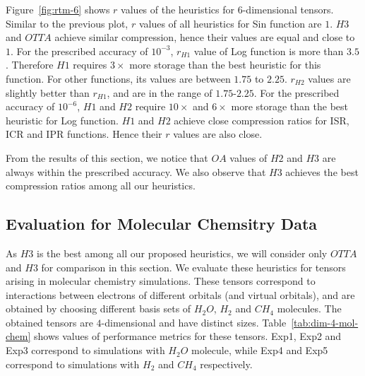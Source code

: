 \documentclass[runningheads]{llncs}
\begin{document}
\noindent Figure~\ref{fig:rtm-6} shows $r$ values of the heuristics for $6$-dimensional tensors. Similar to the previous plot, $r$ values of all heuristics for Sin function are $1$. ${H3}$ and ${OTTA}$ achieve similar compression, hence their values are equal and close to $1$. For the prescribed accuracy of $10^{-3}$, $r_{H1}$ value of Log function is more than $3.5$. Therefore $H1$ requires $3\times$ more storage than the best heuristic for this function. For other functions, its values are between $1.75$ to $2.25$. $r_{H2}$ values are slightly better than $r_{H1}$, and are in the range of $1.75$-$2.25$. For the prescribed accuracy of $10^{-6}$, $H1$ and $H2$ require $10\times$ and $6\times$ more storage than the best heuristic for Log function. $H1$ and $H2$ achieve close compression ratios for ISR, ICR and IPR functions. Hence their $r$ values are also close.

\medskip
\noindent From the results of this section, we notice that $OA$ values of $H2$ and $H3$ are always within the prescribed accuracy. We also observe that $H3$ achieves the best compression ratios among all our heuristics. 

\subsection{Evaluation for Molecular Chemsitry Data}
As $H3$ is the best among all our proposed heuristics, we will consider only $OTTA$ and $H3$ for comparison in this section. We evaluate these heuristics for tensors arising in molecular chemistry simulations. These tensors correspond to interactions between electrons of different orbitals (and virtual orbitals), and are obtained by choosing different basis sets of $H_2O$, $H_2$ and $CH_4$ molecules. The obtained tensors are $4$-dimensional and have distinct sizes. Table~\ref{tab:dim-4-mol-chem} shows values of performance metrics for these tensors. Exp1, Exp2 and Exp3 correspond to simulations with $H_2O$ molecule, while Exp4 and Exp5 correspond to simulations with $H_2$ and $CH_4$ respectively. 
 
\end{document}

